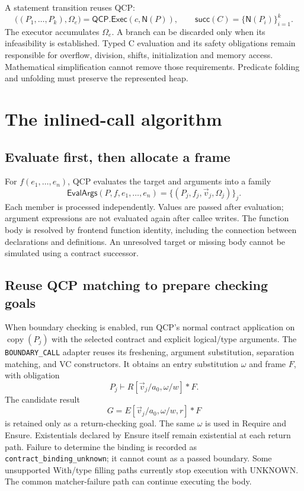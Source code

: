 \documentclass[10pt]{article}
\newcommand{\Norm}{\mathsf{N}}
\begin{document}
A statement transition reuses QCP:
\[
 \bigl((P_1,\ldots,P_k),\Omega_e\bigr)
      =\mathsf{QCP.Exec}(c,\Norm(P)),\qquad
 \mathsf{succ}(C)=\{\Norm(P_i)\}_{i=1}^{k}.
\]
The executor accumulates $\Omega_e$. A branch can be discarded only when its
infeasibility is established. Typed C evaluation and its safety obligations
remain responsible for overflow, division, shifts, initialization and memory
access. Mathematical simplification cannot remove those requirements.
Predicate folding and unfolding must preserve the represented heap.

\section{The inlined-call algorithm}
\subsection{Evaluate first, then allocate a frame}
For $f(e_1,\ldots,e_n)$, QCP evaluates the target and arguments into a family
\[
 \mathsf{EvalArgs}(P,f,e_1,\ldots,e_n)
       =\{(P_j,f_j,\vec v_j,\Omega_j)\}_j.
\]
Each member is processed independently. Values are passed after evaluation;
argument expressions are not evaluated again after callee writes.
The function body is resolved by frontend function identity, including the
connection between declarations and definitions. An unresolved target or
missing body cannot be simulated using a contract successor.

\subsection{Reuse QCP matching to prepare checking goals}
When boundary checking is enabled, run QCP's normal contract application on
$\operatorname{copy}(P_j)$ with the selected contract and explicit logical/type
arguments. The \texttt{BOUNDARY\_CALL} adapter reuses its freshening,
argument substitution, separation matching, and VC constructors. It obtains
an entry substitution $\omega$ and frame $F$, with obligation
\[
 P_j\vdash R[\vec v_j/a_0,\omega/w]*F.
\]
The candidate result
\[
 G=E[\vec v_j/a_0,\omega/w,r]*F
\]
is retained only as a return-checking goal. The same $\omega$ is used in
Require and Ensure. Existentials declared by Ensure itself remain existential
at each return path. Failure to determine the binding is recorded as
\texttt{contract\_binding\_unknown}; it cannot count as a passed boundary.
Some unsupported With/type filling paths currently stop execution with
UNKNOWN. The common matcher-failure path can continue executing the body.
\end{document}
